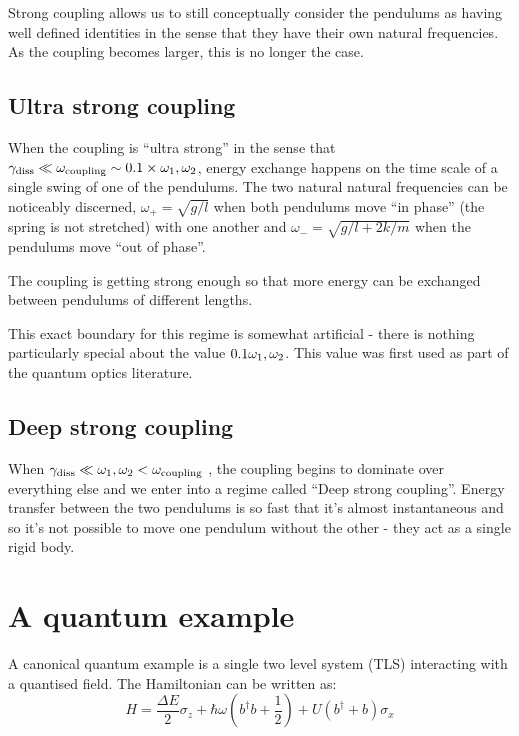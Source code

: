 \documentclass[
]{article}
\renewcommand{\[}{\begin{equation}}
\renewcommand{\]}{\end{equation}}
\begin{document}
Strong coupling allows us to still conceptually consider the pendulums
as having well defined identities in the sense that they have their own
natural frequencies. As the coupling becomes larger, this is no longer
the case.

\subsection{Ultra strong coupling}\label{ultra-strong-coupling}

When the coupling is ``ultra strong'' in the sense that
\(\gamma_{\rm diss} \ll \omega_{\rm coupling} \sim 0.1\times  \omega_1,\omega_2\),
energy exchange happens on the time scale of a single swing of one of
the pendulums. The two natural natural frequencies can be noticeably
discerned, \(\omega_+ = \sqrt{g/l}\) when both pendulums move ``in
phase'' (the spring is not stretched) with one another and
\(\omega_- = \sqrt{g/l + 2k/m}\) when the pendulums move ``out of
phase''.

The coupling is getting strong enough so that more energy can be
exchanged between pendulums of different lengths.

This exact boundary for this regime is somewhat artificial - there is
nothing particularly special about the value
\(0.1 \omega_{\rm 1}, \omega_2\). This value was first used as part of
the quantum optics literature.

\subsection{Deep strong coupling}\label{deep-strong-coupling}

When \(\gamma_{\rm diss} \ll \omega_1,\omega_2 < \omega_{\rm coupling}\)
, the coupling begins to dominate over everything else and we enter into
a regime called ``Deep strong coupling''. Energy transfer between the
two pendulums is so fast that it's almost instantaneous and so it's not
possible to move one pendulum without the other - they act as a single
rigid body.

\section{A quantum example}\label{a-quantum-example}

A canonical quantum example is a single two level system (TLS)
interacting with a quantised field. The Hamiltonian can be written as:
\[
H = \frac{\Delta E}{2} \sigma_z + \hbar\omega\left(b^{\dagger}b +\frac{1}{2}\right) + U\left( b^{\dagger} + b \right)\sigma_x
\label{eq:H}
\]
\end{document}
